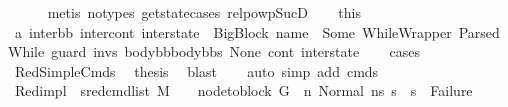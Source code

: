 \begin{isabellebody}
\ \ \ \ \isamarkupfalse%
\ {\isacharparenleft}{\kern0pt}metis\ {\isacharparenleft}{\kern0pt}no{\isacharunderscore}{\kern0pt}types{\isacharparenright}{\kern0pt}\ get{\isacharunderscore}{\kern0pt}state{\isachardot}{\kern0pt}cases\ relpowp{\isacharunderscore}{\kern0pt}Suc{\isacharunderscore}{\kern0pt}D{}{\isacharparenright}{\kern0pt}\isanewline
\ \ \isamarkupfalse%
\ this\ \isamarkupfalse%
\ a{}{\isacharcolon}{\kern0pt}\ {\isachardoublequoteopen}{\isacharparenleft}{\kern0pt}inter{\isacharunderscore}{\kern0pt}bb{\isacharcomma}{\kern0pt}\ inter{\isacharunderscore}{\kern0pt}cont{\isacharcomma}{\kern0pt}\ inter{\isacharunderscore}{\kern0pt}state{\isacharparenright}{\kern0pt}\ {\isacharequal}{\kern0pt}\ {\isacharparenleft}{\kern0pt}{\isacharparenleft}{\kern0pt}BigBlock\ name\ {\isacharbrackleft}{\kern0pt}{\isacharbrackright}{\kern0pt}\ {\isacharparenleft}{\kern0pt}Some\ {\isacharparenleft}{\kern0pt}WhileWrapper\ {\isacharparenleft}{\kern0pt}ParsedWhile\ guard\ invs\ {\isacharparenleft}{\kern0pt}body{\isacharunderscore}{\kern0pt}bb{}{\isacharhash}{\kern0pt}body{\isacharunderscore}{\kern0pt}bbs{\isacharparenright}{\kern0pt}{\isacharparenright}{\kern0pt}{\isacharparenright}{\kern0pt}{\isacharparenright}{\kern0pt}\ None{\isacharparenright}{\kern0pt}{\isacharcomma}{\kern0pt}\ cont{}{\isacharcomma}{\kern0pt}\ inter{\isacharunderscore}{\kern0pt}state{\isacharparenright}{\kern0pt}{\isachardoublequoteclose}\isanewline
\ \ \isamarkupfalse%
\ cases\isanewline
\ \ \ \ \isamarkupfalse%
\ RedSimpleCmds\ \isamarkupfalse%
\ {\isacharquery}{\kern0pt}thesis\ \isamarkupfalse%
\ blast\isanewline
\ \ \isamarkupfalse%
\ {\isacharparenleft}{\kern0pt}auto\ simp\ add{\isacharcolon}{\kern0pt}\ {\isacartoucheopen}cmds\ {\isasymnoteq}\ {\isacharbrackleft}{\kern0pt}{\isacharbrackright}{\kern0pt}{\isacartoucheclose}{\isacharparenright}{\kern0pt}\isanewline
\ \ \isamarkupfalse%
\ Red{\isacharunderscore}{\kern0pt}impl{\isacharcolon}{\kern0pt}\ {\isachardoublequoteopen}{\isacharparenleft}{\kern0pt}{\isasymAnd}\ s{}{\isacharprime}{\kern0pt}{\isachardot}{\kern0pt}{\isacharparenleft}{\kern0pt}{\isacharparenleft}{\kern0pt}red{\isacharunderscore}{\kern0pt}cmd{\isacharunderscore}{\kern0pt}list\ M\ {\isasymLambda}\ {\isasymGamma}\ {\isasymOmega}\ {\isacharparenleft}{\kern0pt}node{\isacharunderscore}{\kern0pt}to{\isacharunderscore}{\kern0pt}block\ G\ {\isacharbang}{\kern0pt}\ n{\isacharparenright}{\kern0pt}\ {\isacharparenleft}{\kern0pt}Normal\ ns{}{\isacharparenright}{\kern0pt}\ s{}{\isacharprime}{\kern0pt}{\isacharparenright}{\kern0pt}\ {\isasymLongrightarrow}\ {\isacharparenleft}{\kern0pt}s{}{\isacharprime}{\kern0pt}\ {\isasymnoteq}\ Failure{\isacharparenright}{\kern0pt}{\isacharparenright}{\kern0pt}{\isacharparenright}{\kern0pt}{\isachardoublequoteclose}\ \isamarkupfalse%

\end{isabellebody}
